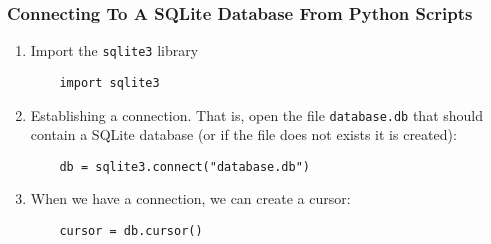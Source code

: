 \documentclass[dvipsnames]{beamer}
\begin{document}
\begin{frame}[fragile=singleslide]
\frametitle{Connecting To A SQLite Database From Python Scripts}


  \begin{enumerate}

  \item Import the \texttt{sqlite3} library 
    \begin{small}
\begin{verbatim}
    import sqlite3
\end{verbatim}
    \end{small}
  \item Establishing a connection. That is, open the file
    \texttt{database.db} that should contain a SQLite database (or if the
    file does not exists it is created): 
    \begin{small}
\begin{verbatim}
    db = sqlite3.connect("database.db")
\end{verbatim}
    \end{small}

  \item When we have a connection, we can create a cursor:
    \begin{small}
\begin{verbatim}
    cursor = db.cursor()
\end{verbatim}
    \end{small}
\end{enumerate}

\end{frame}
\end{document}
